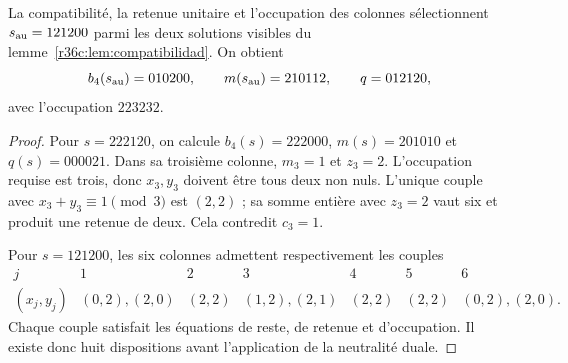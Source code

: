 \begin{proposition}
La compatibilité, la retenue unitaire et l’occupation des colonnes sélectionnent $s_{\rm au}=121200$ parmi les deux solutions visibles du lemme~\ref{r36c:lem:compatibilidad}. On obtient
\[
b_4(s_{\rm au})=010200,\qquad
m(s_{\rm au})=210112,\qquad q=012120,
\]
avec l’occupation $223232$.
\end{proposition}
\begin{proof}
Pour $s=222120$, on calcule $b_4(s)=222000$, $m(s)=201010$ et $q(s)=000021$. Dans sa troisième colonne, $m_3=1$ et $z_3=2$. L’occupation requise est trois, donc $x_3,y_3$ doivent être tous deux non nuls. L’unique couple avec $x_3+y_3\equiv1\pmod3$ est $(2,2)$ ; sa somme entière avec $z_3=2$ vaut six et produit une retenue de deux. Cela contredit $c_3=1$.

Pour $s=121200$, les six colonnes admettent respectivement les couples
\[
\begin{array}{c|cccccc}
j&1&2&3&4&5&6\\\hline
(x_j,y_j)&(0,2),(2,0)&(2,2)&(1,2),(2,1)&(2,2)&(2,2)&(0,2),(2,0).
\end{array}
\]
Chaque couple satisfait les équations de reste, de retenue et d’occupation. Il existe donc huit dispositions avant l’application de la neutralité duale.
\end{proof}

